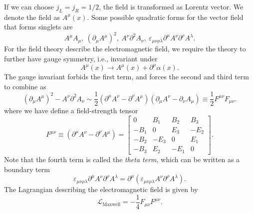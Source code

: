If we can choose $j_L=j_R=1/2$, the field is transformed as Lorentz vector.
We denote the field as $A^\mu(x)$.
Some possible quadratic forms for the vector field that forms singlets are
\begin{equation*}
	A^\mu A_\mu,\ (\partial_\mu A^\mu)^2,\ A^\nu \partial^2 A_\nu,\ 
	\varepsilon_{\mu\nu\rho\lambda} \partial^\mu A^\nu \partial^\rho A^\lambda.
\end{equation*}
For the field theory describe the electromagnetic field, we require the theory to further have gauge symmetry, i.e., invariant under
\begin{equation}
	A^\mu(x) \rightarrow A^\mu(x) + \partial^\mu \alpha(x).
\end{equation}
The gauge invariant forbids the first term, and forces the second and third term to combine as
\begin{equation*}
	(\partial_\mu A^\mu)^2 - A^\nu \partial^2 A_\nu
	\sim \frac{1}{2}(\partial^\mu A^\nu - \partial^\nu A^\mu)(\partial_\mu A^\nu-\partial_\nu A_\mu)
	\equiv \frac{1}{2} F^{\mu\nu}F_{\mu\nu}.
\end{equation*}
where we have define a field-strength tensor
\begin{equation}
	F^{\mu\nu}\equiv (\partial^\mu A^\nu - \partial^\nu A^\mu)
	= \left[\begin{array}{cccc}
		0 & B_1 & B_2 & B_3 \\
		-B_1 & 0 & E_3 & -E_2 \\
		-B_2 & -E_3 & 0 & E_1 \\
		-B_3 & E_2 & -E_1 & 0
	\end{array} \right].
\end{equation}
Note that the fourth term is called the \textit{theta term}, which can be written as a boundary term
\begin{equation*}
	\varepsilon_{\mu\nu\rho\lambda} \partial^\mu A^\nu \partial^\rho A^\lambda
	= \partial^\mu (\varepsilon_{\mu\nu\rho\lambda} A^\nu \partial^\rho A^\lambda).
\end{equation*}
The Lagrangian describing the electromagnetic field is given by
\begin{equation}
	\mathcal{L}_{\mathrm{Maxwell}} = -\frac{1}{4}F_{\mu\nu}F^{\mu\nu}.
\end{equation}



